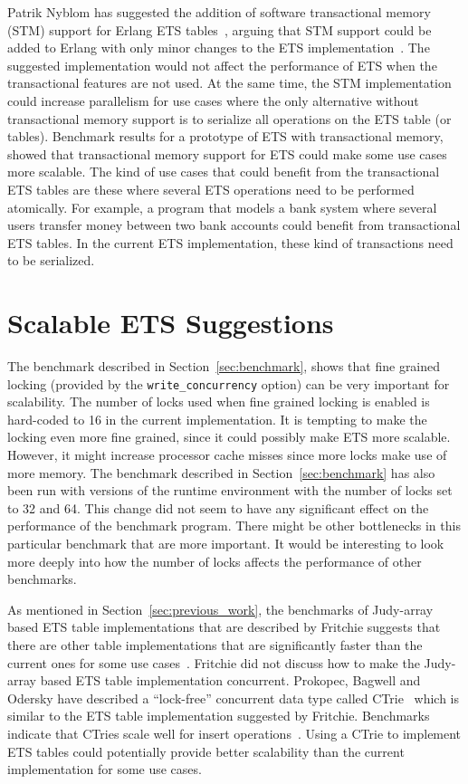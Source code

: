 \documentclass[aps,pre,preprint,nofootinbib]{revtex4}
\begin{document}
Patrik Nyblom has suggested the addition of software transactional memory (STM) support for Erlang ETS tables~\cite{PatrikErlangTrans}, arguing that STM support could be added to Erlang with only minor changes to the ETS implementation~\cite{PatrikErlangTrans}.
The suggested implementation would not affect the performance of ETS when the transactional features are not used.
At the same time, the  STM implementation could increase parallelism for use cases where the only alternative without transactional memory support is to serialize all operations on the ETS table (or tables).
Benchmark results for a prototype of ETS with transactional memory, showed that transactional memory support for ETS could make some use cases more scalable.
The kind of use cases that could benefit from the transactional ETS tables are these where several ETS operations need to be performed atomically.
For example, a program that models a bank system where several users transfer money between two bank accounts could benefit from transactional ETS tables. 
In the current ETS implementation, these kind of transactions need to be serialized.



\section{Scalable ETS Suggestions}\label{sec:suggestions}

The benchmark described in Section~\ref{sec:benchmark}, shows that fine grained locking (provided by the \verb|write_concurrency| option) can be very important for scalability.
The number of locks used when fine grained locking is enabled is hard-coded to 16 in the current implementation.
It is tempting to make the locking even more fine grained, since it could possibly make ETS more scalable.
However, it might increase processor cache misses since more locks make use of more memory.
The benchmark described in Section~\ref{sec:benchmark} has also been run with versions of the runtime environment with the number of locks set to 32 and 64.
This change did not seem to have any significant effect on the performance of the benchmark program.
There might be other bottlenecks in this particular benchmark that are more important.
It would be interesting to look more deeply into how the number of locks affects the performance of other benchmarks.

As mentioned in Section~\ref{sec:previous_work}, the benchmarks of Judy-array based ETS table implementations that are described by Fritchie suggests that there are other table implementations that are significantly faster than the current ones for some use cases~\cite{ScottEtsJudy}.
Fritchie did not discuss how to make the Judy-array based ETS table implementation concurrent.
Prokopec, Bagwell and Odersky have described a ``lock-free'' concurrent data type called CTrie~\cite{ProkopecCTrie} which is similar to the ETS table implementation suggested by Fritchie.
Benchmarks indicate that CTries scale well for insert operations~\cite{ProkopecCTrie}.
Using a CTrie to implement ETS tables could potentially provide better scalability than the current implementation for some use cases.
\end{document}
